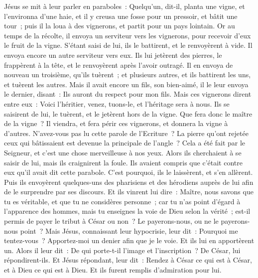 \begin{multicols}{2}
\VerseOne{}Jésus se mit à leur parler en paraboles~: Quelqu'un, dit-il, planta une vigne, et l'environna d'une haie, et il y creusa une fosse pour un pressoir, et bâtit une tour~; puis il la loua à des vignerons, et partit pour un pays lointain.
Or au temps de la récolte, il envoya un serviteur vers les vignerons, pour recevoir d'eux le fruit de la vigne.
S'étant saisi de lui, ils le battirent, et le renvoyèrent à vide.
Il envoya encore un autre serviteur vers eux. Ils lui jetèrent des pierres, le frappèrent à la tête, et le renvoyèrent après l'avoir outragé.
Il en envoya de nouveau un troisième, qu'ils tuèrent~; et plusieurs autres, et ils battirent les uns, et tuèrent les autres.
Mais il avait encore un fils, son bien-aimé, il le leur envoya le dernier, disant~: Ils auront du respect pour mon fils.
Mais ces vignerons dirent entre eux~: Voici l'héritier, venez, tuons-le, et l'héritage sera à nous.
Ils se saisirent de lui, le tuèrent, et le jetèrent hors de la vigne.
Que fera donc le maître de la vigne~? Il viendra, et fera périr ces vignerons, et donnera la vigne à d'autres.
N'avez-vous pas lu cette parole de l'Ecriture~? La pierre qu'ont rejetée ceux qui bâtissaient est devenue la principale de l'angle~?
Cela a été fait par le Seigneur, et c'est une chose merveilleuse à nos yeux.
Alors ils cherchaient à se saisir de lui, mais ils craignirent la foule. Ils avaient compris que c'était contre eux qu'il avait dit cette parabole. C'est pourquoi, ils le laissèrent, et s'en allèrent.
Puis ils envoyèrent quelques-uns des pharisiens et des hérodiens auprès de lui afin de le surprendre par ses discours.
Et ils vinrent lui dire~: Maître, nous savons que tu es véritable, et que tu ne considères personne~; car tu n'as point d'égard à l'apparence des hommes, mais tu enseignes la voie de Dieu selon la vérité~; est-il permis de payer le tribut à César ou non~? Le payerons-nous, ou ne le payerons-nous point~?
Mais Jésus, connaissant leur hypocrisie, leur dit~: Pourquoi me tentez-vous~? Apportez-moi un denier afin que je le voie.
Et ils lui en apportèrent un. Alors il leur dit~: De qui porte-t-il l'image et l'inscription~? De César, lui répondirent-ils.
Et Jésus répondant, leur dit~: Rendez à César ce qui est à César, et à Dieu ce qui est à Dieu. Et ils furent remplis d'admiration pour lui.

\end{multicols}
